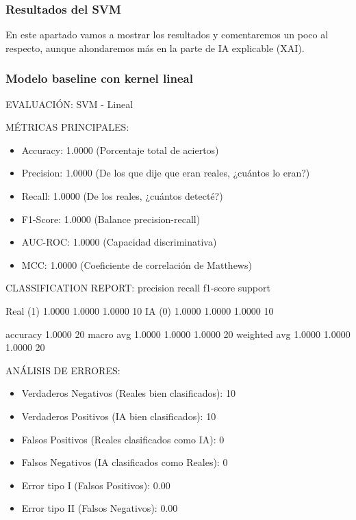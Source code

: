 \subsubsection*{Resultados del SVM}

En este apartado vamos a mostrar los resultados y comentaremos un poco  al respecto, aunque ahondaremos más en la parte de IA explicable (XAI).

\subsubsection*{Modelo baseline con kernel lineal}

 EVALUACIÓN: SVM - Lineal

MÉTRICAS PRINCIPALES:
\begin{itemize}
	\item Accuracy:  1.0000  (Porcentaje total de aciertos)
	\item Precision: 1.0000  (De los que dije que eran reales, ¿cuántos lo eran?)
	\item Recall:    1.0000  (De los reales, ¿cuántos detecté?)
	\item F1-Score:  1.0000  (Balance precision-recall)
	\item AUC-ROC:   1.0000  (Capacidad discriminativa)
	\item MCC:       1.0000  (Coeficiente de correlación de Matthews)
\end{itemize}

CLASSIFICATION REPORT:
              precision    recall  f1-score   support

    Real (1)     1.0000    1.0000    1.0000        10
      IA (0)     1.0000    1.0000    1.0000        10

    accuracy                         1.0000        20
   macro avg     1.0000    1.0000    1.0000        20
weighted avg     1.0000    1.0000    1.0000        20


ANÁLISIS DE ERRORES:
\begin{itemize}
	\item Verdaderos Negativos (Reales bien clasificados): 10
	\item Verdaderos Positivos (IA bien clasificados): 10
	\item Falsos Positivos (Reales clasificados como IA): 0
	\item Falsos Negativos (IA clasificados como Reales): 0
	\item Error tipo I (Falsos Positivos): 0.00%
	\item Error tipo II (Falsos Negativos): 0.00%
\end{itemize}

